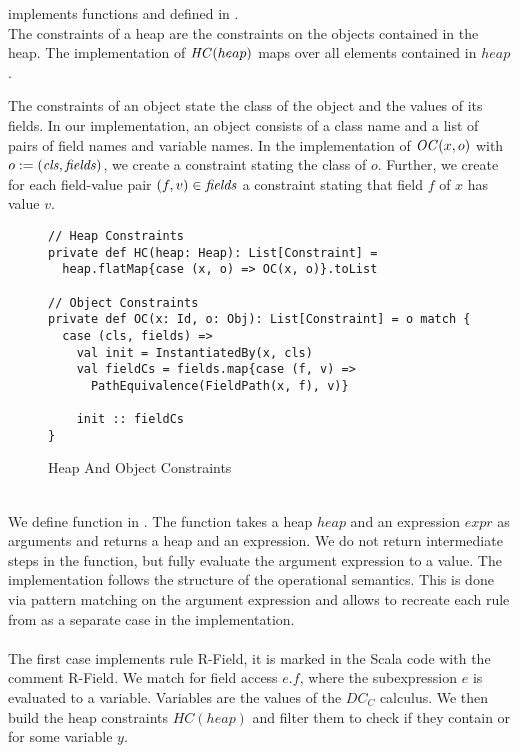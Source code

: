 %
 implements functions  and 
defined in .
\\
The constraints of a heap are the constraints
on the objects contained in the heap.
The implementation of $\mathit{HC}(heap)$ maps  over
all elements contained in $heap$.

The constraints of an object state the class of the object
and the values of its fields.
In our implementation, an object consists of a class name
and a list of pairs of field names and variable names.
In the implementation of $\mathit{OC}(x, o)$ with $o := (\mathit{cls}, \mathit{fields})$,
we create a constraint  stating the class of $o$.
Further, we create for each field-value pair $(f, v) \in \mathit{fields}$
a constraint  stating that field $f$ of $x$ has value $v$.
%
\begin{figure}[h]
\begin{lstlisting}
// Heap Constraints
private def HC(heap: Heap): List[Constraint] =
  heap.flatMap{case (x, o) => OC(x, o)}.toList

// Object Constraints
private def OC(x: Id, o: Obj): List[Constraint] = o match {
  case (cls, fields) =>
    val init = InstantiatedBy(x, cls)
    val fieldCs = fields.map{case (f, v) =>
      PathEquivalence(FieldPath(x, f), v)}

    init :: fieldCs
}
\end{lstlisting}
\caption{Heap And Object Constraints}
\label{fig:scala-heapconstr}
\end{figure}
\\
We define function  in .
The function takes a heap $heap$ and an expression $expr$
as arguments and returns a heap and an expression.
We do not return intermediate steps in the function,
but fully evaluate the argument expression to a value.
The implementation follows the structure of the operational
semantics.
This is done via pattern matching on the argument expression
and allows to recreate each rule from 
as a separate case in the implementation.\\
\\
The first case implements rule R-Field,
it is marked in the Scala code with the comment R-Field.
We match for field access $e.f$, where the subexpression $e$
is evaluated to a variable.
Variables are the values of the $DC_C$ calculus.
We then build the heap constraints $HC(heap)$
and filter them to check if they contain 
or  for some variable $y$.
